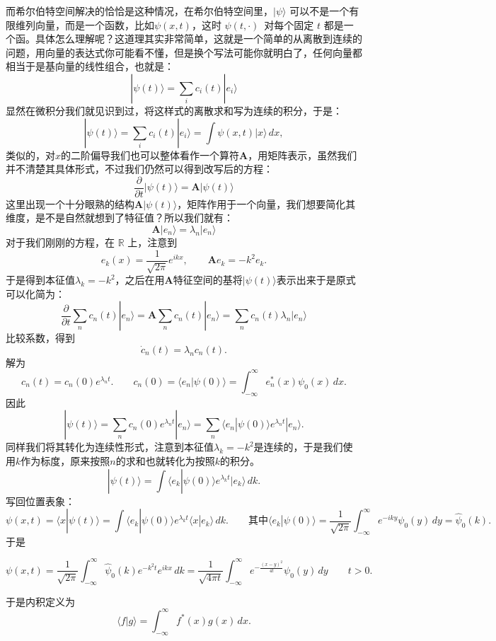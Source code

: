 \documentclass[UTF8]{ctexbook}
\begin{document}
而希尔伯特空间解决的恰恰是这种情况，在希尔伯特空间里，$|\psi\rangle$ 可以不是一个有限维列向量，而是一个函数，比如$\psi(x,t)$，这时 $\psi(t,\cdot)$\ 对每个固定 \(t\) 都是一个函。具体怎么理解呢？这道理其实非常简单，这就是一个简单的从离散到连续的问题，用向量的表达式你可能看不懂，但是换个写法可能你就明白了，任何向量都相当于是基向量的线性组合，也就是：
\[
|\psi(t)\rangle
=
\sum_i c_i(t) |e_i\rangle
\]
显然在微积分我们就见识到过，将这样式的离散求和写为连续的积分，于是：
\[
|\psi(t)\rangle
=
\sum_i c_i (t) |e_i\rangle
=
\int \psi(x,t)|x\rangle\,dx,
\]
类似的，对$x$的二阶偏导我们也可以整体看作一个算符$\mathbf{A}$，用矩阵表示，虽然我们并不清楚其具体形式，不过我们仍然可以得到改写后的方程：
\[
\frac{\partial}{\partial t}|\psi(t)\rangle
=
\mathbf{A}
|\psi(t)\rangle
\]
这里出现一个十分眼熟的结构$\mathbf{A}|\psi(t)\rangle$，矩阵作用于一个向量，我们想要简化其维度，是不是自然就想到了特征值？所以我们就有：
\[
\mathbf{A}|e_n\rangle
=
\lambda_n |e_n\rangle
\]
对于我们刚刚的方程，在 \(\mathbb R\) 上，注意到
\[
e_k(x)=\frac{1}{\sqrt{2\pi}}e^{ikx},
\qquad
\mathbf A e_k=-k^2 e_k.
\]
于是得到本征值$\lambda_k=-k^2$，之后在用$\mathbf{A}$特征空间的基将$|\psi(t)\rangle$表示出来于是原式可以化简为：
\[
\frac{\partial}{\partial t}\sum_n c_n(t)|e_n\rangle
=
\mathbf A\sum_n c_n(t)|e_n\rangle
=
\sum_n c_n(t)\lambda_n|e_n\rangle
\]
比较系数，得到
\[
\dot c_n(t)=\lambda_n c_n(t).
\]
解为
\[
c_n(t)=c_n(0)e^{\lambda_n t}.
\qquad
c_n(0)=\langle e_n|\psi(0)\rangle
=
\int_{-\infty}^{\infty} e_n^*(x)\psi_0(x)\,dx.
\]
因此
\[
|\psi(t)\rangle
=
\sum_n c_n(0)e^{\lambda_n t}|e_n\rangle
=
\sum_n
\langle e_n|\psi(0)\rangle
e^{\lambda_n t}
|e_n\rangle.
\]
同样我们将其转化为连续性形式，注意到本征值$\lambda_k=-k^2$是连续的，于是我们使用$k$作为标度，原来按照$n$的求和也就转化为按照$k$的积分。
\[
|\psi(t)\rangle
=
\int
\langle e_k|\psi(0)\rangle
e^{\lambda_k t}
|e_k\rangle\,dk.
\]
写回位置表象：
\[
\psi(x,t)
=
\langle x|\psi(t)\rangle
=
\int
\langle e_k|\psi(0)\rangle
e^{\lambda_k t}
\langle x|e_k\rangle\,dk.
\qquad
\text{其中}
\langle e_k|\psi(0)\rangle
=
\frac{1}{\sqrt{2\pi}}
\int_{-\infty}^{\infty} e^{-iky}\psi_0(y)\,dy
=
\hat\psi_0(k).
\]
于是

\[
\psi(x,t)
=
\frac{1}{\sqrt{2\pi}}
\int_{-\infty}^{\infty}
\hat\psi_0(k)
e^{-k^2t}
e^{ikx}\,dk
=
\frac{1}{\sqrt{4\pi t}}
\int_{-\infty}^{\infty}
e^{-\frac{(x-y)^2}{4t}}
\psi_0(y)\,dy
\qquad t>0.
\]



于是内积定义为
\[
\langle f|g\rangle
=
\int_{-\infty}^{\infty}f^*(x)g(x)\,dx.
\]
\end{document}
